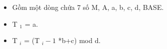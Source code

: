 \begin{itemize}
	\item     Gồm một dòng chứa 7 số M, A, a, b, c, d, BASE.   
	\item     T    $_     1    $    = a.   
	\item     T    $_     i    $    = (T    $_     i-1    $    *b+c) mod d.   
\end{itemize}